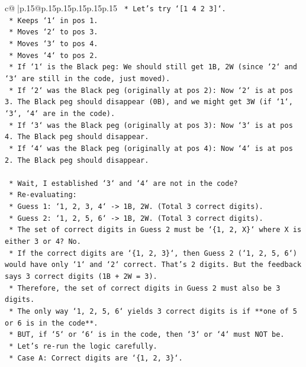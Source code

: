 \documentclass{article}
\begin{document}
{\begin{supertabular}{c@{$\;$}|p{.15\linewidth}@{}p{.15\linewidth}p{.15\linewidth}p{.15\linewidth}p{.15\linewidth}p{.15\linewidth}}
{{{\texttt{    *   Let's try `{[}1 4 2 3{]}`.} \\
\texttt{        *   Keeps `1` in pos 1.} \\
\texttt{        *   Moves `2` to pos 3.} \\
\texttt{        *   Moves `3` to pos 4.} \\
\texttt{        *   Moves `4` to pos 2.} \\
\texttt{        *   If `1` is the Black peg: We should still get 1B, 2W (since `2` and `3` are still in the code, just moved).} \\
\texttt{        *   If `2` was the Black peg (originally at pos 2): Now `2` is at pos 3. The Black peg should disappear (0B), and we might get 3W (if `1`, `3`, `4` are in the code).} \\
\texttt{        *   If `3` was the Black peg (originally at pos 3): Now `3` is at pos 4. The Black peg should disappear.} \\
\texttt{        *   If `4` was the Black peg (originally at pos 4): Now `4` is at pos 2. The Black peg should disappear.} \\
\\ 
\texttt{    *   Wait, I established `3` and `4` are not in the code?} \\
\texttt{        *   Re{-}evaluating:} \\
\texttt{        *   Guess 1: `1, 2, 3, 4` {-}> 1B, 2W. (Total 3 correct digits).} \\
\texttt{        *   Guess 2: `1, 2, 5, 6` {-}> 1B, 2W. (Total 3 correct digits).} \\
\texttt{        *   The set of correct digits in Guess 2 must be `\{1, 2, X\}` where X is either 3 or 4? No.} \\
\texttt{        *   If the correct digits are `\{1, 2, 3\}`, then Guess 2 (`1, 2, 5, 6`) would have only `1` and `2` correct. That's 2 digits. But the feedback says 3 correct digits (1B + 2W = 3).} \\
\texttt{        *   Therefore, the set of correct digits in Guess 2 must also be 3 digits.} \\
\texttt{        *   The only way `1, 2, 5, 6` yields 3 correct digits is if **one of 5 or 6 is in the code**.} \\
\texttt{        *   BUT, if `5` or `6` is in the code, then `3` or `4` must NOT be.} \\
\texttt{        *   Let's re{-}run the logic carefully.} \\
\texttt{        *   Case A: Correct digits are `\{1, 2, 3\}`.} \\
}}}
\end{supertabular}}
\end{document}
